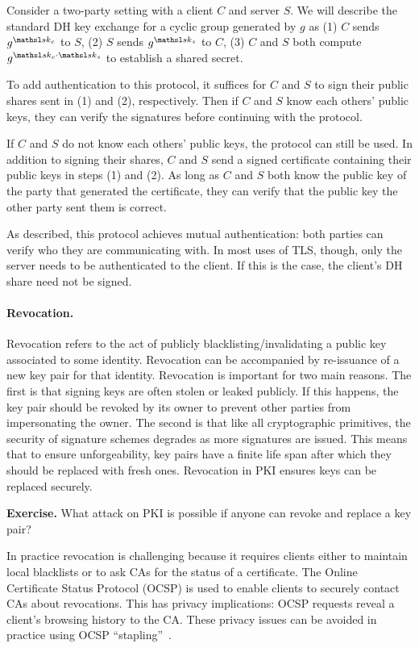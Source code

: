 Consider a two-party setting with a client $C$ and server $S$.
We will describe the standard DH key exchange for a cyclic
group generated by $g$ as (1) $C$ sends $g^{\sk_c}$ to $S$,
(2) $S$ sends $g^{\sk_s}$ to $C$, (3) $C$ and $S$ both compute
$g^{\sk_c \cdot \sk_s}$ to establish a shared secret.

To add authentication to this protocol, it suffices for $C$ and $S$
to sign their public shares sent in (1) and (2), respectively.
Then if $C$ and $S$ know each others' public keys, they can verify
the signatures before continuing with the protocol.

If $C$ and $S$ do not know each others' public keys, the protocol
can still be used. In addition to signing their shares, $C$ and $S$
send a signed certificate containing their public keys in steps
(1) and (2). As long as $C$ and $S$ both know the public key of the party
that generated the certificate, they can verify that the public
key the other party sent them is correct. 

As described, this protocol achieves mutual authentication: both parties
can verify who they are communicating with. In most uses of TLS, though,
only the server needs to be authenticated to the client. If this is the case,
the client's DH share need not be signed.

\paragraph{Revocation.} Revocation refers to the act of publicly blacklisting/invalidating
a public key associated to some identity. Revocation can be accompanied by re-issuance of
a new key pair for that identity. Revocation is important for two main reasons. The first
is that signing keys are often stolen or leaked publicly. If this happens, the key pair
should be revoked by its owner to prevent other parties from impersonating the owner.
The second is that like all cryptographic primitives, the security of signature schemes
degrades as more signatures are issued. This means that to ensure unforgeability, key pairs
have a finite life span after which they should be replaced with fresh ones. Revocation
in PKI ensures keys can be replaced securely.

\noindent\textbf{Exercise.} What attack on PKI is possible if anyone can revoke and replace
a key pair?

In practice revocation is challenging because it requires clients either to maintain local blacklists
or to ask CAs for the status of a certificate. The Online Certificate Status Protocol (OCSP)
is used to enable clients to securely contact CAs about revocations. This has privacy
implications: OCSP requests reveal a client's browsing history to the CA. These privacy issues
can be avoided in practice using OCSP ``stapling''~\cite{deacon2007lightweight}.

